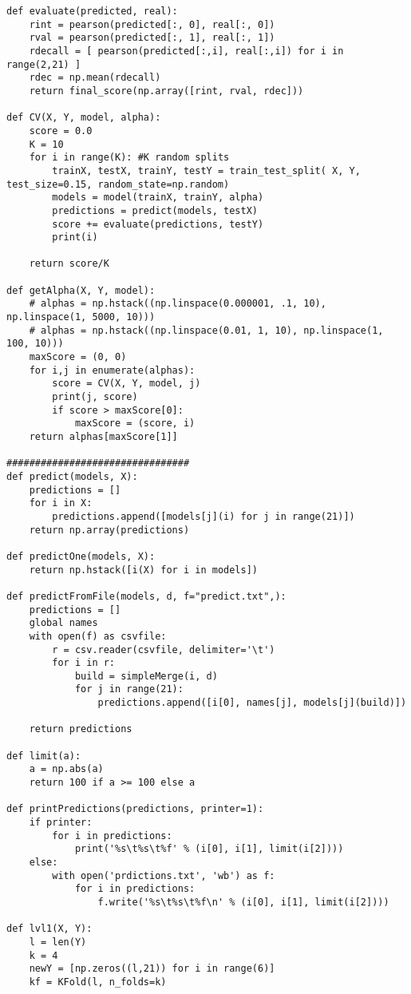 \documentclass[a4paper,11pt]{article}
\begin{document}
\begin{lstlisting}
def evaluate(predicted, real):
    rint = pearson(predicted[:, 0], real[:, 0])
    rval = pearson(predicted[:, 1], real[:, 1])
    rdecall = [ pearson(predicted[:,i], real[:,i]) for i in range(2,21) ]
    rdec = np.mean(rdecall)
    return final_score(np.array([rint, rval, rdec]))

def CV(X, Y, model, alpha):
    score = 0.0
    K = 10
    for i in range(K): #K random splits
        trainX, testX, trainY, testY = train_test_split( X, Y, test_size=0.15, random_state=np.random)
        models = model(trainX, trainY, alpha)
        predictions = predict(models, testX)
        score += evaluate(predictions, testY)
        print(i)

    return score/K

def getAlpha(X, Y, model):
    # alphas = np.hstack((np.linspace(0.000001, .1, 10), np.linspace(1, 5000, 10)))
    # alphas = np.hstack((np.linspace(0.01, 1, 10), np.linspace(1, 100, 10)))
    maxScore = (0, 0)
    for i,j in enumerate(alphas):
        score = CV(X, Y, model, j)
        print(j, score)
        if score > maxScore[0]:
            maxScore = (score, i)
    return alphas[maxScore[1]]

################################
def predict(models, X):
    predictions = []
    for i in X:
        predictions.append([models[j](i) for j in range(21)])
    return np.array(predictions)

def predictOne(models, X):
    return np.hstack([i(X) for i in models])

def predictFromFile(models, d, f="predict.txt",):
    predictions = []
    global names
    with open(f) as csvfile:
        r = csv.reader(csvfile, delimiter='\t')
        for i in r:
            build = simpleMerge(i, d)
            for j in range(21):
                predictions.append([i[0], names[j], models[j](build)])

    return predictions

def limit(a):
    a = np.abs(a)
    return 100 if a >= 100 else a

def printPredictions(predictions, printer=1):
    if printer:
        for i in predictions:
            print('%s\t%s\t%f' % (i[0], i[1], limit(i[2])))
    else:
        with open('prdictions.txt', 'wb') as f:
            for i in predictions:
                f.write('%s\t%s\t%f\n' % (i[0], i[1], limit(i[2])))

def lvl1(X, Y):
    l = len(Y)
    k = 4
    newY = [np.zeros((l,21)) for i in range(6)]
    kf = KFold(l, n_folds=k)


\end{lstlisting}
\end{document}
